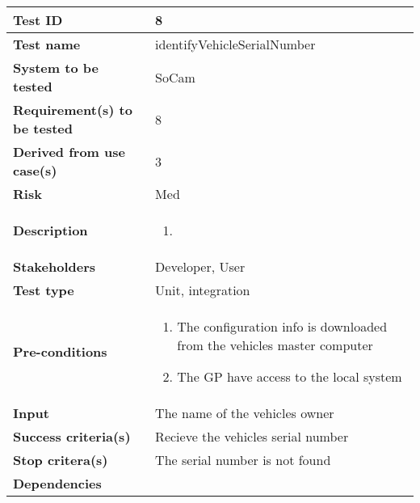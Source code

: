\begin{table}[H]
			\begin{tabular}{| p{4cm} | p{10cm} |}
			\hline
			\rowcolor{gray}
				{\bf Test ID} & 8 \\ \hline
				{\bf Test name} & identifyVehicleSerialNumber \\ \hline
				{\bf System to be tested} & SoCam \\ \hline
				{\bf Requirement(s) to be tested} & 8 \\ \hline
				{\bf Derived from use case(s)} & 3 \\ \hline
				{\bf Risk} & Med \\  \hline
				{\bf Description} & 
					\begin{enumerate}
						\item
					\end{enumerate}
				\\ \hline
				{\bf Stakeholders} & Developer, User \\ \hline
				{\bf Test type} & Unit, integration \\ \hline
				{\bf Pre-conditions} & 
					\begin{enumerate}
						\item The configuration info is downloaded from the 
						vehicles master computer
						\item The GP have access to the local system
					\end{enumerate} \\ \hline
				{\bf Input} & The name of the vehicles owner \\ \hline
				{\bf Success criteria(s)} & Recieve the vehicles serial number \\ \hline
				{\bf Stop critera(s)} &  The serial number is not found \\ \hline
				{\bf Dependencies} & \\ \hline
			\end{tabular}
		\end{table}

